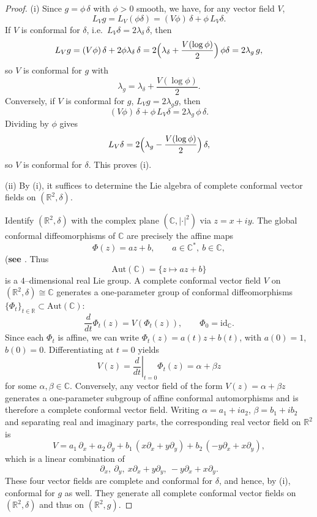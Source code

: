\documentclass{article}
\theoremstyle{definition}
\theoremstyle{remark}
\begin{document}
\begin{proof}
(i) Since $g=\phi\,\delta$ with $\phi>0$ smooth, we have, for any vector field $V$,
\[
L_V g
 = L_V(\phi\delta)
 = (V\phi)\,\delta + \phi\,L_V\delta.
\]
If $V$ is conformal for $\delta$, i.e.\ $L_V\delta = 2\lambda_\delta\,\delta$, then
\[
L_V g
 = (V\phi)\,\delta + 2\phi\lambda_\delta\,\delta
 = 2\Bigl(\lambda_\delta + \frac{V(\log\phi)}{2}\Bigr)\,\phi\delta
 = 2\lambda_g\,g,
\]
so $V$ is conformal for $g$ with
\[
\lambda_g = \lambda_\delta + \frac{V(\log\phi)}{2}. 
\]
\noindent
Conversely, if $V$ is conformal for $g$, $L_V g = 2\lambda_g g$, then
\[
(V\phi)\,\delta + \phi\,L_V\delta = 2\lambda_g\,\phi\,\delta.
\]
Dividing by $\phi$ gives
\[
L_V\delta = 2\Bigl(\lambda_g - \frac{V(\log\phi)}{2}\Bigr)\,\delta,
\]
so $V$ is conformal for $\delta$. This proves (i).

\smallskip
(ii) By (i), it suffices to determine the Lie algebra of complete conformal vector fields on $(\mathbb{R}^2,\delta)$.

Identify $(\mathbb{R}^2,\delta)$ with the complex plane $(\mathbb{C},|\cdot|^2)$ via $z=x+iy$. The global conformal diffeomorphisms of $\mathbb{C}$ are precisely the affine maps
\[
\Phi(z) = a z + b,\qquad a\in\mathbb{C}^\ast,\ b\in\mathbb{C},
\]
({\bf see \cite{MR503901}}. Thus
\[
\mathrm{Aut}(\mathbb{C}) = \{z\mapsto az+b\}
\]
is a $4$--dimensional real Lie group.
\noindent
A complete conformal vector field $V$ on $(\mathbb{R}^2,\delta)\cong\mathbb{C}$ generates a one-parameter group of conformal diffeomorphisms $\{\Phi_t\}_{t\in\mathbb{R}}\subset\mathrm{Aut}(\mathbb{C})$:
\[
\frac{d}{dt}\Phi_t(z) = V(\Phi_t(z)),\qquad \Phi_0=\mathrm{id}_{\mathbb{C}}.
\]
Since each $\Phi_t$ is affine, we can write $\Phi_t(z)=a(t)z + b(t)$, with $a(0)=1$, $b(0)=0$. Differentiating at $t=0$ yields
\[
V(z) = \left.\frac{d}{dt}\right|_{t=0}\Phi_t(z) = \alpha + \beta z
\]
for some $\alpha,\beta\in\mathbb{C}$. Conversely, any vector field of the form $V(z)=\alpha + \beta z$ generates a one-parameter subgroup of affine conformal automorphisms and is therefore a complete conformal vector field.
Writing $\alpha = a_1+ia_2$, $\beta=b_1+ib_2$ and separating real and imaginary parts, the corresponding real vector field on $\mathbb{R}^2$ is
\[
V
 = a_1\,\partial_x + a_2\,\partial_y
 + b_1\,(x\partial_x + y\partial_y)
 + b_2\,(-y\partial_x + x\partial_y),
\]
which is a linear combination of
\[
\partial_x,\ \partial_y,\ x\partial_x + y\partial_y,\ -y\partial_x + x\partial_y.
\]
These four vector fields are complete and conformal for $\delta$, and hence, by (i), conformal for $g$ as well. They generate all complete conformal vector fields on $(\mathbb{R}^2,\delta)$ and thus on $(\mathbb{R}^2,g)$.
\end{proof}
\end{document}
